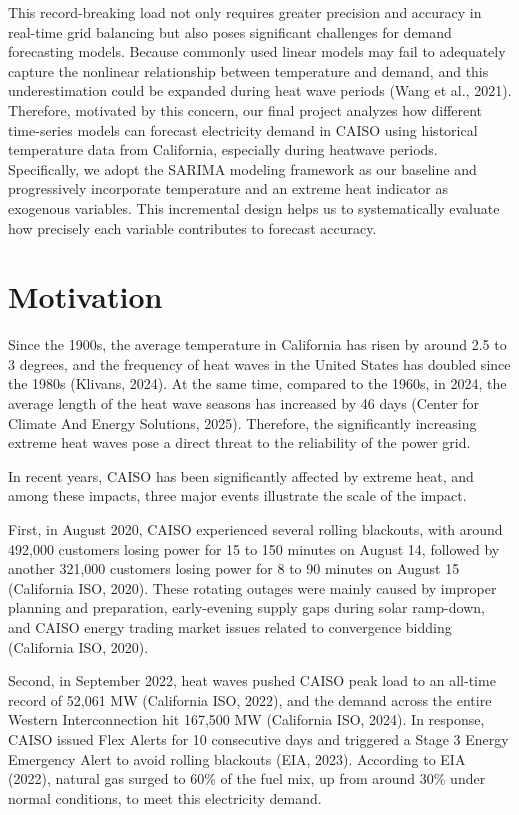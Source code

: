 \documentclass[
]{article}
\begin{document}
This record-breaking load not only requires greater precision and
accuracy in real-time grid balancing but also poses significant
challenges for demand forecasting models. Because commonly used linear
models may fail to adequately capture the nonlinear relationship between
temperature and demand, and this underestimation could be expanded
during heat wave periods (Wang et al., 2021). Therefore, motivated by
this concern, our final project analyzes how different time-series
models can forecast electricity demand in CAISO using historical
temperature data from California, especially during heatwave periods.
Specifically, we adopt the SARIMA modeling framework as our baseline and
progressively incorporate temperature and an extreme heat indicator as
exogenous variables. This incremental design helps us to systematically
evaluate how precisely each variable contributes to forecast accuracy.

\section{Motivation}\label{motivation}

Since the 1900s, the average temperature in California has risen by
around 2.5 to 3 degrees, and the frequency of heat waves in the United
States has doubled since the 1980s (Klivans, 2024). At the same time,
compared to the 1960s, in 2024, the average length of the heat wave
seasons has increased by 46 days (Center for Climate And Energy
Solutions, 2025). Therefore, the significantly increasing extreme heat
waves pose a direct threat to the reliability of the power grid.

In recent years, CAISO has been significantly affected by extreme heat,
and among these impacts, three major events illustrate the scale of the
impact.

First, in August 2020, CAISO experienced several rolling blackouts, with
around 492,000 customers losing power for 15 to 150 minutes on August
14, followed by another 321,000 customers losing power for 8 to 90
minutes on August 15 (California ISO, 2020). These rotating outages were
mainly caused by improper planning and preparation, early-evening supply
gaps during solar ramp-down, and CAISO energy trading market issues
related to convergence bidding (California ISO, 2020).

Second, in September 2022, heat waves pushed CAISO peak load to an
all-time record of 52,061 MW (California ISO, 2022), and the demand
across the entire Western Interconnection hit 167,500 MW (California
ISO, 2024). In response, CAISO issued Flex Alerts for 10 consecutive
days and triggered a Stage 3 Energy Emergency Alert to avoid rolling
blackouts (EIA, 2023). According to EIA (2022), natural gas surged to
60\% of the fuel mix, up from around 30\% under normal conditions, to
meet this electricity demand.
\end{document}
